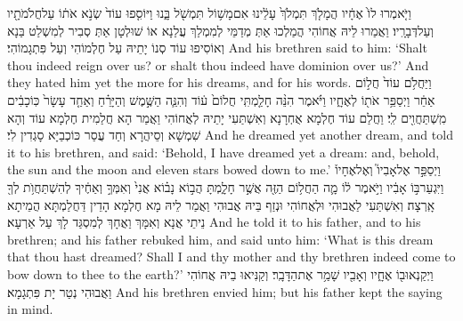 {וַיֹּ֤אמְרוּ לוֹ֙ אֶחָ֔יו הֲמָלֹ֤ךְ תִּמְלֹךְ֙ עָלֵ֔ינוּ אִם\maqqaf מָשׁ֥וֹל תִּמְשֹׁ֖ל בָּ֑נוּ וַיּוֹסִ֤פוּ עוֹד֙ שְׂנֹ֣א אֹת֔וֹ עַל\maqqaf חֲלֹמֹתָ֖יו וְעַל\maqqaf דְּבָרָֽיו׃}
{וַאֲמַרוּ לֵיהּ אֲחוֹהִי הֲמַלְכוּ אַתְּ מְדַמֵּי לְמִמְלַךְ עֲלַנָא אוֹ שׁוּלְטָן אַתְּ סְבִיר לְמִשְׁלַט בַּנָא וְאוֹסִיפוּ עוֹד סְנוֹ יָתֵיהּ עַל חֶלְמוֹהִי וְעַל פִּתְגָמוֹהִי׃}
{And his brethren said to him: ‘Shalt thou indeed reign over us? or shalt thou indeed have dominion over us?’ And they hated him yet the more for his dreams, and for his words.}{}
{וַיַּחֲלֹ֥ם עוֹד֙ חֲל֣וֹם אַחֵ֔ר וַיְסַפֵּ֥ר אֹת֖וֹ לְאֶחָ֑יו וַיֹּ֗אמֶר הִנֵּ֨ה חָלַ֤מְתִּֽי חֲלוֹם֙ ע֔וֹד וְהִנֵּ֧ה הַשֶּׁ֣מֶשׁ וְהַיָּרֵ֗חַ וְאַחַ֤ד עָשָׂר֙ כּֽוֹכָבִ֔ים מִֽשְׁתַּחֲוִ֖ים לִֽי׃}
{וַחֲלַם עוֹד חֶלְמָא אֻחְרָנָא וְאִשְׁתַּעִי יָתֵיהּ לְאֲחוֹהִי וַאֲמַר הָא חֲלַמִית חֶלְמָא עוֹד וְהָא שִׁמְשָׁא וְסֵיהֲרָא וְחַד עֲסַר כּוֹכְבַיָּא סָגְדִין לִי׃}
{And he dreamed yet another dream, and told it to his brethren, and said: ‘Behold, I have dreamed yet a dream: and, behold, the sun and the moon and eleven stars bowed down to me.’}{}
{וַיְסַפֵּ֣ר אֶל\maqqaf אָבִיו֮ וְאֶל\maqqaf אֶחָיו֒ וַיִּגְעַר\maqqaf בּ֣וֹ אָבִ֔יו וַיֹּ֣אמֶר ל֔וֹ מָ֛ה הַחֲל֥וֹם הַזֶּ֖ה אֲשֶׁ֣ר חָלָ֑מְתָּ הֲב֣וֹא נָב֗וֹא אֲנִי֙ וְאִמְּךָ֣ וְאַחֶ֔יךָ לְהִשְׁתַּחֲוֺ֥ת לְךָ֖ אָֽרְצָה׃}
{וְאִשְׁתַּעִי לַאֲבוּהִי וּלְאֲחוֹהִי וּנְזַף בֵּיהּ אֲבוּהִי וַאֲמַר לֵיהּ מָא חֶלְמָא הָדֵין דַּחֲלַמְתָּא הֲמֵיתָא נֵיתֵי אֲנָא וְאִמָּךְ וַאֲחָךְ לְמִסְגַּד לָךְ עַל אַרְעָא׃}
{And he told it to his father, and to his brethren; and his father rebuked him, and said unto him: ‘What is this dream that thou hast dreamed? Shall I and thy mother and thy brethren indeed come to bow down to thee to the earth?’}{}
{וַיְקַנְאוּ\maqqaf ב֖וֹ אֶחָ֑יו וְאָבִ֖יו שָׁמַ֥ר אֶת\maqqaf הַדָּבָֽר׃}
{וְקַנִּיאוּ בֵיהּ אֲחוֹהִי וַאֲבוּהִי נְטַר יָת פִּתְגָמָא׃}
{And his brethren envied him; but his father kept the saying in mind.}{}

